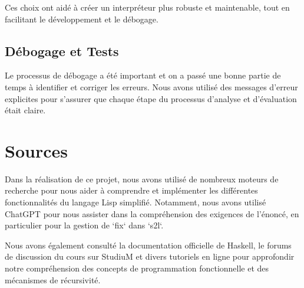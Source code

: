 \documentclass[a4paper,12pt]{article}
\begin{document}
Ces choix ont aidé à créer un interpréteur plus robuste et maintenable, tout en facilitant le développement et le débogage.

\subsection{Débogage et Tests}

Le processus de débogage a été important et on a passé une bonne partie de temps à identifier et corriger les erreurs. Nous avons utilisé des messages d'erreur explicites pour s'assurer que chaque étape du processus d'analyse et d'évaluation était claire. 

\section{Sources}

Dans la réalisation de ce projet, nous avons utilisé de nombreux moteurs de recherche pour nous aider à comprendre et implémenter les différentes fonctionnalités du langage Lisp simplifié. Notamment, nous avons utilisé ChatGPT pour nous assister dans la compréhension des exigences de l'énoncé, en particulier pour la gestion de `fix` dans `s2l`.

Nous avons également consulté la documentation officielle de Haskell, le forums de discussion du cours sur StudiuM et divers tutoriels en ligne pour approfondir notre compréhension des concepts de programmation fonctionnelle et des mécanismes de récursivité.
\end{document}
